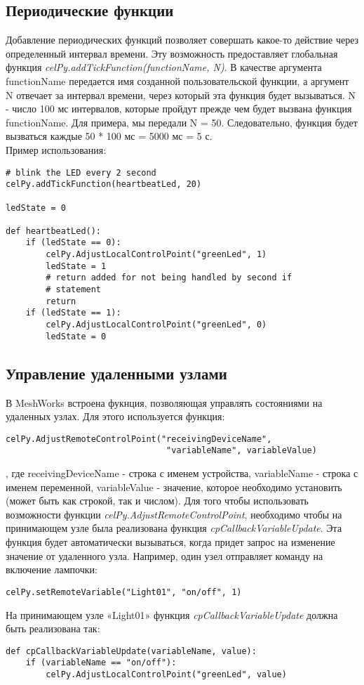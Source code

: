 \documentclass[12pt]{article}
\begin{document}
\subsection{Периодические функции}
Добавление периодических функций позволяет совершать какое-то действие через 
определенный интервал времени. Эту возможность предоставляет глобальная функция 
\emph{celPy.addTickFunction(functionName, N)}. В качестве аргумента functionName 
передается имя созданной пользовательской функции, а аргумент N отвечает за 
интервал времени, через который эта функция будет вызываться. N - число 100 мс 
интервалов, которые пройдут прежде чем будет вызвана функция functionName.
Для примера, мы передали N = 50. Следовательно, функция будет вызваться каждые 
50 * 100 мс = 5000 мс = 5 с. \\
Пример использования:
\begin{verbatim}
# blink the LED every 2 second
celPy.addTickFunction(heartbeatLed, 20)

ledState = 0

def heartbeatLed():
    if (ledState == 0):
        celPy.AdjustLocalControlPoint("greenLed", 1)
        ledState = 1
        # return added for not being handled by second if
        # statement
        return
    if (ledState == 1):
        celPy.AdjustLocalControlPoint("greenLed", 0)
        ledState = 0
\end{verbatim}
\subsection{Управление удаленными узлами}
В MeshWorks встроена фукнция, позволяющая управлять состояниями на удаленных узлах.
Для этого используется функция:
\begin{verbatim}
celPy.AdjustRemoteControlPoint("receivingDeviceName", 
                                "variableName", variableValue)
\end{verbatim}
, где receivingDeviceName - строка с именем устройства, variableName - строка с 
именем переменной, variableValue - значение, которое необходимо установить (может 
быть как строкой, так и числом). Для того чтобы использовать возможности функции 
\emph{celPy.AdjustRemoteControlPoint}, необходимо чтобы на принимающем узле была 
реализована функция \emph{cpCallbackVariableUpdate}. Эта функция будет автоматически 
вызываться, когда придет запрос на изменение значение от удаленного узла.
Например, один узел отправляет команду на включение лампочки:
\begin{verbatim}
celPy.setRemoteVariable("Light01", "on/off", 1)
\end{verbatim}
На принимающем узле «Light01» функция \emph{cpCallbackVariableUpdate} должна быть
реализована так:
\begin{verbatim}
def cpCallbackVariableUpdate(variableName, value):
    if (variableName == "on/off"):
        celPy.AdjustLocalControlPoint("greenLed", value)
\end{verbatim}
\end{document}
